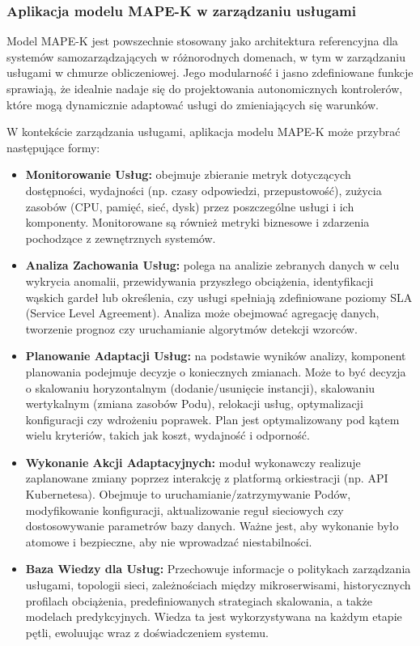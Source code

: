 \subsubsection{Aplikacja modelu MAPE-K w zarządzaniu usługami}
Model MAPE-K jest powszechnie stosowany jako architektura referencyjna dla systemów samozarządzających w różnorodnych domenach, w tym w zarządzaniu usługami w chmurze obliczeniowej. Jego modularność i jasno zdefiniowane funkcje sprawiają, że idealnie nadaje się do projektowania autonomicznych kontrolerów, które mogą dynamicznie adaptować usługi do zmieniających się warunków.

W kontekście zarządzania usługami, aplikacja modelu MAPE-K może przybrać następujące formy:
\begin{itemize}
    \item \textbf{Monitorowanie Usług:} obejmuje zbieranie metryk dotyczących dostępności, wydajności (np. czasy odpowiedzi, przepustowość), zużycia zasobów (CPU, pamięć, sieć, dysk) przez poszczególne usługi i ich komponenty. Monitorowane są również metryki biznesowe i zdarzenia pochodzące z zewnętrznych systemów.
    \item \textbf{Analiza Zachowania Usług:} polega na analizie zebranych danych w celu wykrycia anomalii, przewidywania przyszłego obciążenia, identyfikacji wąskich gardeł lub określenia, czy usługi spełniają zdefiniowane poziomy SLA (Service Level Agreement). Analiza może obejmować agregację danych, tworzenie prognoz czy uruchamianie algorytmów detekcji wzorców.
    \item \textbf{Planowanie Adaptacji Usług:} na podstawie wyników analizy, komponent planowania podejmuje decyzje o koniecznych zmianach. Może to być decyzja o skalowaniu horyzontalnym (dodanie/usunięcie instancji), skalowaniu wertykalnym (zmiana zasobów Podu), relokacji usług, optymalizacji konfiguracji czy wdrożeniu poprawek. Plan jest optymalizowany pod kątem wielu kryteriów, takich jak koszt, wydajność i odporność.
    \item \textbf{Wykonanie Akcji Adaptacyjnych:} moduł wykonawczy realizuje zaplanowane zmiany poprzez interakcję z platformą orkiestracji (np. API Kubernetesa). Obejmuje to uruchamianie/zatrzymywanie Podów, modyfikowanie konfiguracji, aktualizowanie reguł sieciowych czy dostosowywanie parametrów bazy danych. Ważne jest, aby wykonanie było atomowe i bezpieczne, aby nie wprowadzać niestabilności.
    \item \textbf{Baza Wiedzy dla Usług:} Przechowuje informacje o politykach zarządzania usługami, topologii sieci, zależnościach między mikroserwisami, historycznych profilach obciążenia, predefiniowanych strategiach skalowania, a także modelach predykcyjnych. Wiedza ta jest wykorzystywana na każdym etapie pętli, ewoluując wraz z doświadczeniem systemu.
\end{itemize}
